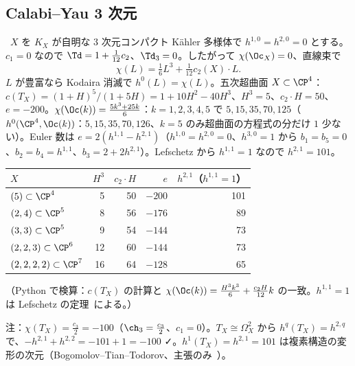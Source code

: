 \subsection{Calabi--Yau 3 次元}
\begin{ex}\label{ex:CY3}\tP\
$X$ を $K_X$ が自明な 3 次元コンパクト Kähler 多様体で $h^{1,0}=h^{2,0}=0$ とする。$c_1=0$ なので $\Td=1+\frac1{12}c_2$、$\Td_3=0$。したがって $\chi(\Oc_X)=0$、直線束で
\[
\chi(L)=\tfrac16L^3+\tfrac1{12}c_2(X)\cdot L.
\]
$L$ が豊富なら Kodaira 消滅で $h^0(L)=\chi(L)$。五次超曲面 $X\subset\CP^4$：$c(T_X)=(1+H)^5/(1+5H)=1+10H^2-40H^3$、$H^3=5$、$c_2\cdot H=50$、$e=-200$。$\chi(\Oc(k))=\frac{5k^3+25k}6$：$k=1,2,3,4,5$ で $5,15,35,70,125$（$h^0(\CP^4,\Oc(k))$：$5,15,35,70,126$、$k=5$ のみ超曲面の方程式の分だけ $1$ 少ない）。Euler 数は $e=2(h^{1,1}-h^{2,1})$（$h^{1,0}=h^{2,0}=0$、$h^{3,0}=1$ から $b_1=b_5=0$、$b_2=b_4=h^{1,1}$、$b_3=2+2h^{2,1}$）。Lefschetz から $h^{1,1}=1$ なので $h^{2,1}=101$。
\begin{center}
\begin{tabular}{l|rrrr}
\toprule
$X$ & $H^3$ & $c_2\cdot H$ & $e$ & $h^{2,1}$（$h^{1,1}=1$）\\
\midrule
$(5)\subset\CP^4$ & 5 & 50 & $-200$ & 101\\
$(2,4)\subset\CP^5$ & 8 & 56 & $-176$ & 89\\
$(3,3)\subset\CP^5$ & 9 & 54 & $-144$ & 73\\
$(2,2,3)\subset\CP^6$ & 12 & 60 & $-144$ & 73\\
$(2,2,2,2)\subset\CP^7$ & 16 & 64 & $-128$ & 65\\
\bottomrule
\end{tabular}
\end{center}
（Python で検算：$c(T_X)$ の計算と $\chi(\Oc(k))=\frac{H^3k^3}6+\frac{c_2H}{12}k$ の一致。$h^{1,1}=1$ は Lefschetz の定理\tC\ による。）
\end{ex}
\noindent 注：$\chi(T_X)=\frac{c_3}2=-100$（$\ch_3=\frac{c_3}2$、$c_1=0$）。$T_X\cong\Omega^2_X$ から $h^q(T_X)=h^{2,q}$ で、$-h^{2,1}+h^{2,2}=-101+1=-100$ ✓。$h^1(T_X)=h^{2,1}=101$ は複素構造の変形の次元（Bogomolov--Tian--Todorov、主張のみ\tC\ ）。


